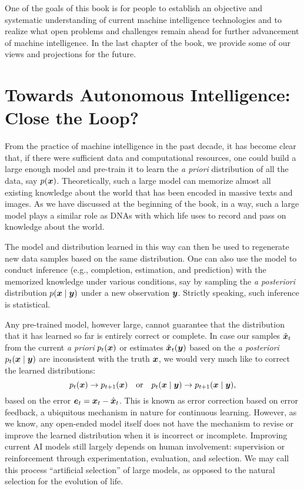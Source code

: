 \documentclass[../../book-main.tex]{subfiles}
\begin{document}
One of the goals of this book is for people to establish an objective and systematic understanding of current machine intelligence technologies and to realize what open problems and challenges remain ahead for further advancement of machine intelligence. In the last chapter of the book, we provide some of our views and projections for the future. 

\section{Towards Autonomous Intelligence: Close the Loop?}
From the practice of machine intelligence in the past decade, it has become clear that, if there were sufficient data and computational resources, one could build a large enough model and pre-train it to learn the {\em a priori} distribution of all the data, say $p(\bm{x})$. Theoretically, such a large model can memorize almost all existing knowledge about the world that has been encoded in massive texts and images. As we have discussed at the beginning of the book, in a way, such a large model plays a similar role as DNAs with which life uses to record and pass on knowledge about the world.  

The model and distribution learned in this way can then be used to regenerate new data samples based on the same distribution. One can also use the model to conduct inference (e.g., completion, estimation, and prediction) with the memorized knowledge under various conditions, say by sampling the {\em a posteriori} distribution $p(\bm{x}\mid \bm{y})$ under a new observation $\bm{y}$. Strictly speaking, such inference is statistical. 

Any pre-trained model, however large, cannot guarantee that the distribution that it has learned so far is entirely correct or complete. In case our samples $\hat{\bm{x}}_t$ from the current {\em a priori} $p_t(\bm{x})$ or estimates $\hat{\bm{x}}_t(\bm{y})$ based on the {\em a posteriori} $p_t(\bm{x}\mid \bm{y})$ are inconsistent with the truth $\bm{x}$, we would very much like to correct the learned distributions:
\begin{equation}
    p_t(\bm{x}) \rightarrow p_{t+1}(\bm{x}) \quad \mbox{or}\quad p_t(\bm{x}\mid \bm{y}) \rightarrow p_{t+1}(\bm{x}\mid \bm{y}),
\end{equation}
based on the error $\boldsymbol{e}_t = \bm{x}_t - \hat{\bm{x}}_t$. This is known as error correction based on error feedback, a ubiquitous mechanism in nature for continuous learning. However, as we know, any open-ended model itself does not have the mechanism to revise or improve the learned distribution when it is incorrect or incomplete. Improving current AI models still largely depends on human involvement: supervision or reinforcement through experimentation, evaluation, and selection. We may call this process ``artificial selection'' of large models, as opposed to the natural selection for the evolution of life. 
\end{document}
